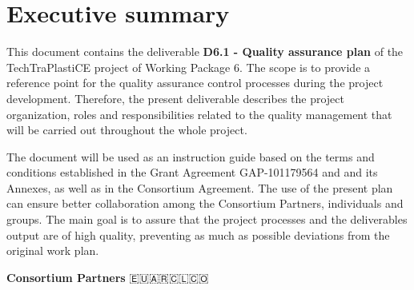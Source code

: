 \documentclass[
  12pt,
  oneside]{book}
\renewcommand*\contentsname{Table of contents}
\newcommand\contentsname{Table of contents}
\begin{document}
\renewcommand*\contentsname{Contents}
{
\hypersetup{linkcolor=}
\setcounter{tocdepth}{2}
\tableofcontents
}
\listoffigures
\listoftables

\mainmatter
\chapter*{Executive summary}\label{executive-summary}

This document contains the deliverable \textbf{D6.1 - Quality assurance
plan} of the TechTraPlastiCE project of Working Package 6. The scope is
to provide a reference point for the quality assurance control processes
during the project development. Therefore, the present deliverable
describes the project organization, roles and responsibilities related
to the quality management that will be carried out throughout the whole
project.

The document will be used as an instruction guide based on the terms and
conditions established in the Grant Agreement GAP-101179564 and and its
Annexes, as well as in the Consortium Agreement. The use of the present
plan can ensure better collaboration among the Consortium Partners,
individuals and groups. The main goal is to assure that the project
processes and the deliverables output are of high quality, preventing as
much as possible deviations from the original work plan.

\textbf{Consortium Partners} 🇪🇺🇦🇷🇨🇱🇨🇴
\end{document}
